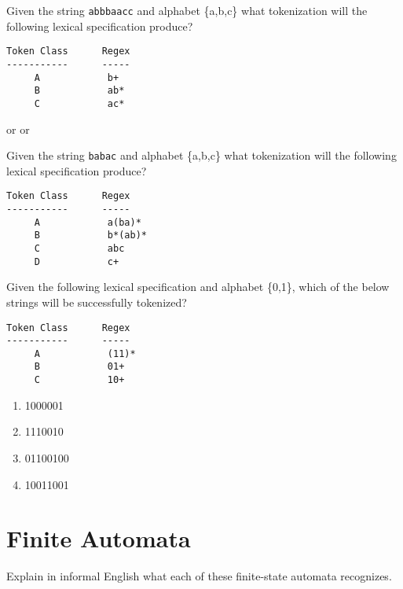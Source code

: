 \documentclass[11pt, oneside]{exam}
\newcommand{\cmark}{\ding{51}}
\begin{document}
\begin{questions}
\question[3]
Given the string {\tt abbbaacc} and alphabet \{a,b,c\} what tokenization will the following lexical specification produce?
\begin{verbatim}
Token Class      Regex
-----------      -----
     A            b+
     B            ab*
     C            ac*
\end{verbatim}
{\tt <B, abbb>}
 or {\tt <C, a>}
 or {\tt <C, a>}

\question[3]
Given the string {\tt babac} and alphabet \{a,b,c\} what tokenization will the following lexical specification produce?
\begin{verbatim}
Token Class      Regex
-----------      -----
     A            a(ba)*
     B            b*(ab)*
     C            abc
     D            c+
\end{verbatim}
{\tt <B, bab>}

\question[6]
Given the following lexical specification and alphabet \{0,1\}, which of the below strings will be successfully tokenized?
\begin{verbatim}
Token Class      Regex
-----------      -----
     A            (11)*
     B            01+
     C            10+
\end{verbatim}
\begin{enumerate}
\item 1000001 \cmark
\item 1110010 \cmark
\item 01100100 \cmark
\item 10011001 \cmark
\end{enumerate}

\section*{Finite Automata}

\question
Explain in informal English what each of these finite-state automata recognizes.

\end{questions}
\end{document}
